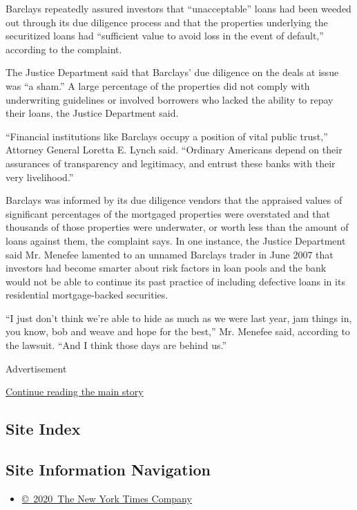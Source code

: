 Barclays repeatedly assured investors that ``unacceptable'' loans had
been weeded out through its due diligence process and that the
properties underlying the securitized loans had ``sufficient value to
avoid loss in the event of default,'' according to the complaint.

The Justice Department said that Barclays' due diligence on the deals at
issue was ``a sham.'' A large percentage of the properties did not
comply with underwriting guidelines or involved borrowers who lacked the
ability to repay their loans, the Justice Department said.

``Financial institutions like Barclays occupy a position of vital public
trust,'' Attorney General Loretta E. Lynch said. ``Ordinary Americans
depend on their assurances of transparency and legitimacy, and entrust
these banks with their very livelihood.''

Barclays was informed by its due diligence vendors that the appraised
values of significant percentages of the mortgaged properties were
overstated and that thousands of those properties were underwater, or
worth less than the amount of loans against them, the complaint says. In
one instance, the Justice Department said Mr. Menefee lamented to an
unnamed Barclays trader in June 2007 that investors had become smarter
about risk factors in loan pools and the bank would not be able to
continue its past practice of including defective loans in its
residential mortgage-backed securities.

``I just don't think we're able to hide as much as we were last year,
jam things in, you know, bob and weave and hope for the best,'' Mr.
Menefee said, according to the lawsuit. ``And I think those days are
behind us.''

Advertisement

\protect\hyperlink{after-bottom}{Continue reading the main story}

\hypertarget{site-index}{%
\subsection{Site Index}\label{site-index}}

\hypertarget{site-information-navigation}{%
\subsection{Site Information
Navigation}\label{site-information-navigation}}

\begin{itemize}
\tightlist
\item
  \href{https://help.nytimes.com/hc/en-us/articles/115014792127-Copyright-notice}{©~2020~The
  New York Times Company}
\end{itemize}

